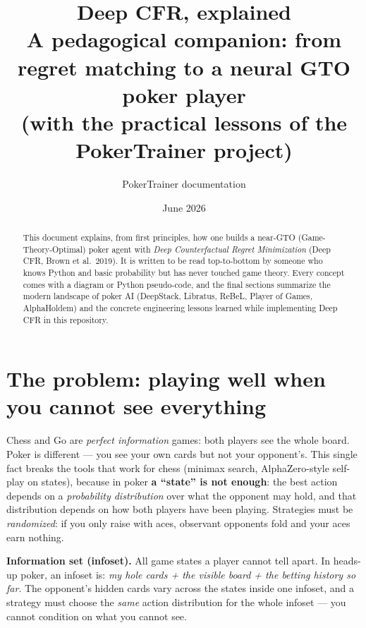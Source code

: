 \documentclass[11pt,a4paper]{article}
\title{\bfseries Deep CFR, explained\\[2mm]
\large A pedagogical companion: from regret matching to a neural GTO poker player\\[1mm]
\normalsize (with the practical lessons of the PokerTrainer project)}
\author{PokerTrainer documentation}
\date{June 2026}
\begin{document}
\maketitle

\begin{abstract}
This document explains, from first principles, how one builds a near-GTO
(Game-Theory-Optimal) poker agent with \emph{Deep Counterfactual Regret
Minimization} (Deep CFR, Brown et al.\ 2019). It is written to be read
top-to-bottom by someone who knows Python and basic probability but has never
touched game theory. Every concept comes with a diagram or Python pseudo-code,
and the final sections summarize the modern landscape of poker AI
(DeepStack, Libratus, ReBeL, Player of Games, AlphaHoldem) and the concrete
engineering lessons learned while implementing Deep CFR in this repository.
\end{abstract}

\tableofcontents
\newpage

\section{The problem: playing well when you cannot see everything}

Chess and Go are \emph{perfect information} games: both players see the whole
board. Poker is different — you see your own cards but not your opponent's.
This single fact breaks the tools that work for chess (minimax search,
AlphaZero-style self-play on states), because in poker \textbf{a ``state'' is
not enough}: the best action depends on a \emph{probability distribution} over
what the opponent may hold, and that distribution depends on how both players
have been playing. Strategies must be \emph{randomized}: if you only raise
with aces, observant opponents fold and your aces earn nothing.

\begin{defbox}
\textbf{Information set (infoset).} All game states a player cannot tell apart.
In heads-up poker, an infoset is: \emph{my hole cards + the visible board + the
betting history so far}. The opponent's hidden cards vary across the states
inside one infoset, and a strategy must choose the \emph{same} action
distribution for the whole infoset --- you cannot condition on what you cannot see.
\end{defbox}
\end{document}
